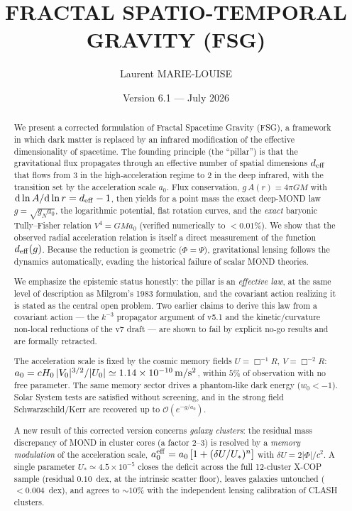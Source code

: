 \documentclass[11pt,a4paper]{article}
\title{FRACTAL SPATIO-TEMPORAL GRAVITY (FSG)}
\author{Laurent MARIE-LOUISE}
\date{Version 6.1 --- July 2026}
\begin{document}
\maketitle
\begin{onehalfspacing}
\begin{abstract}
We present a corrected formulation of Fractal Spacetime Gravity (FSG), a framework in which dark matter is replaced by an infrared modification of the effective dimensionality of spacetime. The founding principle (the ``pillar'') is that the gravitational flux propagates through an effective number of spatial dimensions $d_{\rm eff}$ that flows from $3$ in the high-acceleration regime to $2$ in the deep infrared, with the transition set by the acceleration scale $a_0$. Flux conservation, $g\,A(r)=4\pi G M$ with $\mathrm{d}\ln A/\mathrm{d}\ln r = d_{\rm eff}-1$, then yields for a point mass the exact deep-MOND law $g=\sqrt{g_N a_0}$, the logarithmic potential, flat rotation curves, and the \emph{exact} baryonic Tully--Fisher relation $V^4=GM a_0$ (verified numerically to $<0.01\%$). We show that the observed radial acceleration relation is itself a direct measurement of the function $d_{\rm eff}(g)$. Because the reduction is geometric ($\Phi=\Psi$), gravitational lensing follows the dynamics automatically, evading the historical failure of scalar MOND theories.

We emphasize the epistemic status honestly: the pillar is an \emph{effective law}, at the same level of description as Milgrom's 1983 formulation, and the covariant action realizing it is stated as the central open problem. Two earlier claims to derive this law from a covariant action --- the $k^{-3}$ propagator argument of v5.1 and the kinetic/curvature non-local reductions of the v7 draft --- are shown to fail by explicit no-go results and are formally retracted.

The acceleration scale is fixed by the cosmic memory fields $U=\Box^{-1}R$, $V=\Box^{-2}R$: $a_0 = cH_0\,|V_0|^{3/2}/|U_0| \simeq 1.14\times10^{-10}\,{\rm m/s^2}$, within $5\%$ of observation with no free parameter. The same memory sector drives a phantom-like dark energy ($w_0<-1$). Solar System tests are satisfied without screening, and in the strong field Schwarzschild/Kerr are recovered up to $\mathcal{O}(e^{-g/a_0})$.

A new result of this corrected version concerns \emph{galaxy clusters}: the residual mass discrepancy of MOND in cluster cores (a factor $2$--$3$) is resolved by a \emph{memory modulation} of the acceleration scale, $a_0^{\rm eff}=a_0\,[1+(\delta U/U_*)^n]$ with $\delta U=2|\Phi|/c^2$. A single parameter $U_*\simeq 4.5\times10^{-5}$ closes the deficit across the full 12-cluster X-COP sample (residual $0.10$~dex, at the intrinsic scatter floor), leaves galaxies untouched ($<0.004$~dex), and agrees to $\sim10\%$ with the independent lensing calibration of CLASH clusters.


\end{abstract}
\end{onehalfspacing}
\end{document}
